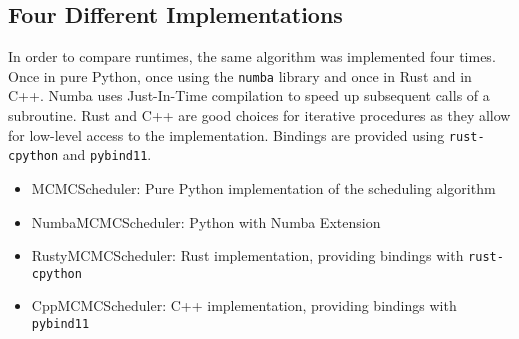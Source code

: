 \subsection{Four Different Implementations}
In order to compare runtimes, the same algorithm was implemented four times.
Once in pure Python, once using the \texttt{numba} library and once in Rust and in C++.
Numba uses Just-In-Time compilation to speed up subsequent calls of a subroutine.
Rust and C++ are good choices for iterative procedures as they allow for low-level access to the implementation. Bindings are provided using \texttt{rust-cpython} and \texttt{pybind11}.

\begin{itemize}
  \item MCMCScheduler: Pure Python implementation of the scheduling algorithm
  \item NumbaMCMCScheduler: Python with Numba Extension
  \item RustyMCMCScheduler: Rust implementation, providing bindings with \texttt{rust-cpython}
  \item CppMCMCScheduler: C++ implementation, providing bindings with \texttt{pybind11}
\end{itemize}
